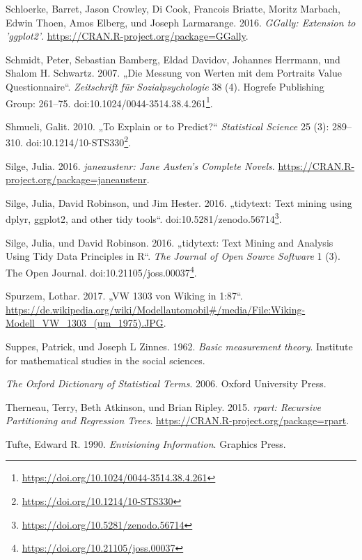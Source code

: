 \documentclass[12pt,ngerman,]{book}
\let\rmarkdownfootnote\footnote%
\def\footnote{\protect\rmarkdownfootnote}
\renewcommand{\href}[2]{#2\footnote{\url{#1}}}
\theoremstyle{definition}
\theoremstyle{definition}
\theoremstyle{remark}
\begin{document}
\hypertarget{ref-R-GGally}{}
Schloerke, Barret, Jason Crowley, Di Cook, Francois Briatte, Moritz
Marbach, Edwin Thoen, Amos Elberg, und Joseph Larmarange. 2016.
\emph{GGally: Extension to 'ggplot2'}.
\url{https://CRAN.R-project.org/package=GGally}.

\hypertarget{ref-Schmidt2007}{}
Schmidt, Peter, Sebastian Bamberg, Eldad Davidov, Johannes Herrmann, und
Shalom H. Schwartz. 2007. „Die Messung von Werten mit dem Portraits
Value Questionnaire``. \emph{Zeitschrift für Sozialpsychologie} 38 (4).
Hogrefe Publishing Group: 261--75.
doi:\href{https://doi.org/10.1024/0044-3514.38.4.261}{10.1024/0044-3514.38.4.261}.

\hypertarget{ref-Shmueli2010}{}
Shmueli, Galit. 2010. „To Explain or to Predict?`` \emph{Statistical
Science} 25 (3): 289--310.
doi:\href{https://doi.org/10.1214/10-STS330}{10.1214/10-STS330}.

\hypertarget{ref-R-janeaustenr}{}
Silge, Julia. 2016. \emph{janeaustenr: Jane Austen's Complete Novels}.
\url{https://CRAN.R-project.org/package=janeaustenr}.

\hypertarget{ref-tidytext-archive}{}
Silge, Julia, David Robinson, und Jim Hester. 2016. „tidytext: Text
mining using dplyr, ggplot2, and other tidy tools``.
doi:\href{https://doi.org/10.5281/zenodo.56714}{10.5281/zenodo.56714}.

\hypertarget{ref-Silge2016}{}
Silge, Julia, und David Robinson. 2016. „tidytext: Text Mining and
Analysis Using Tidy Data Principles in R``. \emph{The Journal of Open
Source Software} 1 (3). The Open Journal.
doi:\href{https://doi.org/10.21105/joss.00037}{10.21105/joss.00037}.

\hypertarget{ref-spurzem_vw_2017}{}
Spurzem, Lothar. 2017. „VW 1303 von Wiking in 1:87``.
\url{https://de.wikipedia.org/wiki/Modellautomobil\#/media/File:Wiking-Modell_VW_1303_(um_1975).JPG}.

\hypertarget{ref-suppes1962basic}{}
Suppes, Patrick, und Joseph L Zinnes. 1962. \emph{Basic measurement
theory}. Institute for mathematical studies in the social sciences.

\hypertarget{ref-oxford}{}
\emph{The Oxford Dictionary of Statistical Terms}. 2006. Oxford
University Press.

\hypertarget{ref-R-rpart}{}
Therneau, Terry, Beth Atkinson, und Brian Ripley. 2015. \emph{rpart:
Recursive Partitioning and Regression Trees}.
\url{https://CRAN.R-project.org/package=rpart}.

\hypertarget{ref-1930824149}{}
Tufte, Edward R. 1990. \emph{Envisioning Information}. Graphics Press.
\end{document}
